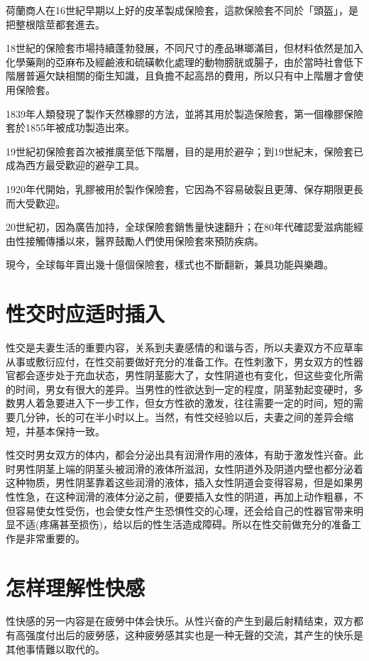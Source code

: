 \documentclass[12pt,UTF8]{ctexbook}
\begin{document}
荷蘭商人在16世紀早期以上好的皮革製成保險套，這款保險套不同於「頭盔」，是把整根陰莖都套進去。

18世紀的保險套市場持續蓬勃發展，不同尺寸的產品琳瑯滿目，但材料依然是加入化學藥劑的亞麻布及經鹼液和硫磺軟化處理的動物膀胱或腸子，由於當時社會低下階層普遍欠缺相關的衛生知識，且負擔不起高昂的費用，所以只有中上階層才會使用保險套。

1839年人類發現了製作天然橡膠的方法，並將其用於製造保險套，第一個橡膠保險套於1855年被成功製造出來。

19世紀初保險套首次被推廣至低下階層，目的是用於避孕；到19世紀末，保險套已成為西方最受歡迎的避孕工具。

1920年代開始，乳膠被用於製作保險套，它因為不容易破裂且更薄、保存期限更長而大受歡迎。

20世紀初，因為廣告加持，全球保險套銷售量快速翻升；在80年代確認愛滋病能經由性接觸傳播以來，醫界鼓勵人們使用保險套來預防疾病。

現今，全球每年賣出幾十億個保險套，樣式也不斷翻新，兼具功能與樂趣。



\section{性交时应适时插入}

性交是夫妻生活的重要内容，关系到夫妻感情的和谐与否，所以夫妻双方不应草率从事或敷衍应付，在性交前要做好充分的准备工作。在性刺激下，男女双方的性器官都会逐步处于充血状态，男性阴茎膨大了，女性阴道也有变化，但这些变化所需的时间，男女有很大的差异。当男性的性欲达到一定的程度，阴茎勃起变硬时，多数男人着急要进入下一步工作，但女方性欲的激发，往往需要一定的时间，短的需要几分钟，长的可在半小时以上。当然，有性交经验以后，夫妻之间的差异会缩短，并基本保持一致。

性交时男女双方的体内，都会分泌出具有润滑作用的液体，有助于激发性兴奋。此时男性阴茎上端的阴茎头被润滑的液体所滋润，女性阴道外及阴道内壁也都分泌着这种物质，男性阴茎靠着这些润滑的液体，插入女性阴道会变得容易，但是如果男性性急，在这种润滑的液体分泌之前，便要插入女性的阴道，再加上动作粗暴，不但容易使女性受伤，也会使女性产生恐惧性交的心理，还会给自己的性器官带来明显不适(疼痛甚至损伤)，给以后的性生活造成障碍。所以在性交前做充分的准备工作是非常重要的。

\section{怎样理解性快感}

性快感的另一内容是在疲勞中体会快乐。从性兴奋的产生到最后射精结束，双方都有高强度付出后的疲勞感，这种疲勞感其实也是一种无聲的交流，其产生的快乐是其他事情難以取代的。
\end{document}
